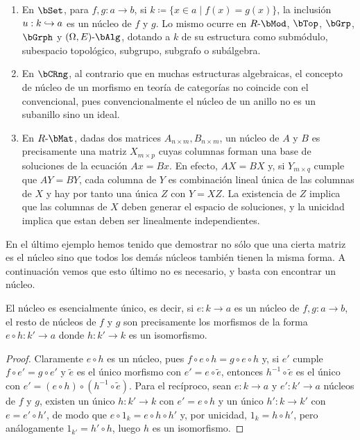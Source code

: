\begin{example}\;
  \label{ex:equalizer}
  \begin{enumerate}
  \item En $\bSet$, para $f,g:a\to b$, si $k\coloneqq\{x\in a\mid f(x)=g(x)\}$,
    la inclusión $u:k\hookrightarrow a$ es un núcleo de $f$ y $g$. Lo mismo ocurre en
    $R\dash\bMod$, $\bTop$, $\bGrp$, $\bGrph$ y $(\Omega,E)\dash\bAlg$, dotando
    a $k$ de su estructura como submódulo, subespacio topológico, subgrupo,
    subgrafo o subálgebra.
  \item En $\bCRng$, al contrario que en muchas estructuras algebraicas, el
    concepto de núcleo de un morfismo en teoría de categorías no coincide con el
    convencional, pues convencionalmente el núcleo de un anillo no es un
    subanillo sino un ideal.
  \item En $R\dash\bMat$, dadas dos matrices $A_{n\times m},B_{n\times m}$, un
    núcleo de $A$ y $B$ es precisamente una matriz $X_{m\times p}$ cuyas
    columnas forman una base de soluciones de la ecuación $Ax=Bx$. En efecto,
    $AX=BX$ y, si $Y_{m\times q}$ cumple que $AY=BY$, cada columna de $Y$ es
    combinación lineal única de las columnas de $X$ y hay por tanto una única
    $Z$ con $Y=XZ$. La existencia de $Z$ implica que las columnas de $X$ deben
    generar el espacio de soluciones, y la unicidad implica que estan deben ser
    linealmente independientes.
  \end{enumerate}
\end{example}

En el último ejemplo hemos tenido que demostrar no sólo que una cierta matriz es
el núcleo sino que todos los demás núcleos también tienen la misma forma. A
continuación vemos que esto último no es necesario, y basta con encontrar un
núcleo.

\begin{proposition}
  \label{prop:equ-uniq}
  El núcleo es esencialmente único, es decir, si $e:k\to a$ es un núcleo de
  $f,g:a\to b$, el resto de núcleos de $f$ y $g$ son precisamente los morfismos
  de la forma $e\circ h:k'\to a$ donde $h:k'\to k$ es un isomorfismo.
\end{proposition}
\begin{proof}
  Claramente $e\circ h$ es un núcleo, pues $f\circ e\circ h=g\circ e\circ h$ y,
  si $e'$ cumple $f\circ e'=g\circ e'$ y $\tilde e$ es el único morfismo con
  $e'=e\circ\tilde e$, entonces $h^{-1}\circ\tilde e$ es el único con
  $e'=(e\circ h)\circ(h^{-1}\circ\tilde e)$. Para el recíproco, sean $e:k\to a$
  y $e':k'\to a$ núcleos de $f$ y $g$, existen un único $h:k'\to k$ con
  $e'=e\circ h$ y un único $h':k\to k'$ con $e=e'\circ h'$, de modo que
  $e\circ 1_k=e\circ h\circ h'$ y, por unicidad, $1_k=h\circ h'$, pero
  análogamente $1_{k'}=h'\circ h$, luego $h$ es un isomorfismo.
\end{proof}

